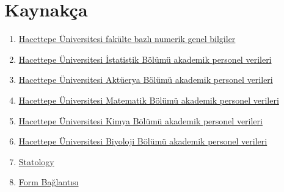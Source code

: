 \documentclass{article}
\begin{document}
\section{Kaynakça}
\begin{enumerate}
    \item \href{https://www.hacettepe.edu.tr/ogretim/sayilarla_ogretim}{Hacettepe Üniversitesi fakülte bazlı numerik genel bilgiler}
    \item \href{https://stat.hacettepe.edu.tr/tr/menu/ogretim_uyeleri-118}{Hacettepe Üniversitesi İstatistik Bölümü akademik personel verileri}
    \item \href{https://aktuerya.hacettepe.edu.tr/pers_ou.php}{Hacettepe Üniversitesi Aktüerya Bölümü akademik personel verileri}
    \item \href{https://mat.hacettepe.edu.tr/akademik_personel.html}{Hacettepe Üniversitesi Matematik Bölümü akademik personel verileri}
    \item \href{https://chem.hacettepe.edu.tr/tr/menu/ogretim_uyeleri-10}{Hacettepe Üniversitesi Kimya Bölümü akademik personel verileri}
    \item \href{https://biology.hacettepe.edu.tr/tr/akademik_personel-226}{Hacettepe Üniversitesi Biyoloji Bölümü akademik personel verileri}
    \item \href{https://www.statology.org}{Statology}
    \item \href{https://docs.google.com/forms/d/e/1FAIpQLSf7CBA1tg89lFSdAl9VRSa4vjmv8COCJtRDvQmYa0n0l72JUA/viewform?usp=sf_link}{Form Bağlantısı} \label{form}
\end{enumerate}
\end{document}
